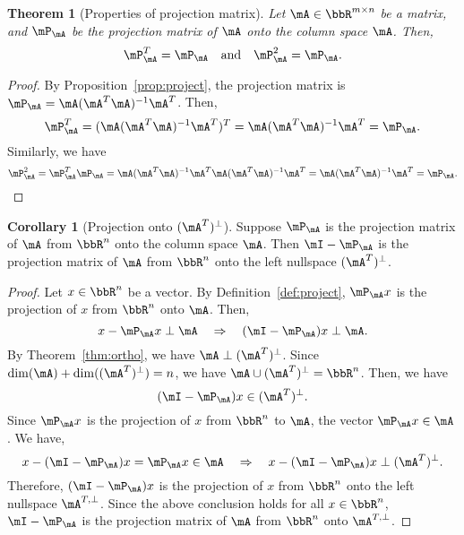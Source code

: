 \documentclass[11pt]{article}
\theoremstyle{plain}
\newtheorem{thm}{Theorem}[section]
\theoremstyle{definition}
\newtheorem{cor}{Corollary}
\begin{document}
\begin{thm}[Properties of projection matrix]\label{thm:projectm}
Let $\mA \in \bbR^{m \times n}$ be a matrix, and $\mP_{\mA}$ be the projection matrix of $\mA$ onto the column space $\mA$. Then,
	\begin{equation}\label{eq:projectm}
		\mP_{\mA}^T = \mP_{\mA}\quad \text{and}\quad  \mP_{\mA}^2 = \mP_{\mA}.
	\end{equation}
\end{thm}
\begin{proof}
	By Proposition~\ref{prop:project}, the projection matrix is $\mP_{\mA} =   \mA(\mA^T \mA)^{-1} \mA^T$. Then,
	\[  \mP_{\mA}^T = (\mA(\mA^T \mA)^{-1} \mA^T )^T = \mA (\mA^T \mA)^{-1} \mA^T = \mP_{\mA}. \]
Similarly, we have
	\[  \mP_{\mA}^2 = \mP_{\mA}^T \mP_{\mA} =  \mA (\mA^T \mA)^{-1} \mA^T  \mA (\mA^T \mA)^{-1} \mA^T =  \mA (\mA^T \mA)^{-1} \mA^T = \mP_{\mA}. \]
\end{proof}

\begin{cor}[Projection onto $(\mA^{T})^{\perp}$]\label{cor:iprojectm}
	Suppose $\mP_{\mA}$ is the projection matrix of $\mA$ from $\bbR^n$ onto the column space $\mA$. Then $\mI-\mP_{\mA}$ is the projection matrix of $\mA$ from $\bbR^n$ onto the left nullspace $(\mA^{T})^{\perp}$. 
\end{cor}

\begin{proof}
	Let $x \in \bbR^n$ be a vector. By Definition~\ref{def:project}, $\mP_{\mA} x$ is the projection of $x$ from $\bbR^n$ onto $\mA$. Then,
	\[ x - \mP_{\mA} x \perp \mA \quad \Rightarrow \quad (\mI-\mP_{\mA})x \perp \mA. \]
	By Theorem~\ref{thm:ortho}, we have $\mA \perp (\mA^{T})^{\perp}$. Since $\dim(\mA) + \dim((\mA^{T})^{\perp}) = n$, we have $\mA  \cup (\mA^{T})^{\perp} = \bbR^n$. Then, we have
	\[ (\mI-\mP_{\mA})x \in  (\mA^{T})^{\perp}.\]
	Since $\mP_{\mA} x$ is the projection of $x$ from $\bbR^n$ to $\mA$,  the vector $\mP_{\mA} x \in \mA$. We have,
	\[ x -  (\mI-\mP_{\mA})x = \mP_{\mA} x \in \mA \quad \Rightarrow \quad  x -  (\mI-\mP_{\mA})x \perp (\mA^{T})^{\perp}.\]
	Therefore, $(\mI-\mP_{\mA})x$ is the projection of $x$ from $\bbR^n$ onto the left nullspace $\mA^{T,\perp}$. Since the above conclusion holds for all $x \in \bbR^n$, $\mI-\mP_{\mA}$ is the projection matrix of $\mA$ from $\bbR^n$ onto $\mA^{T,\perp}$.
\end{proof}
\end{document}
